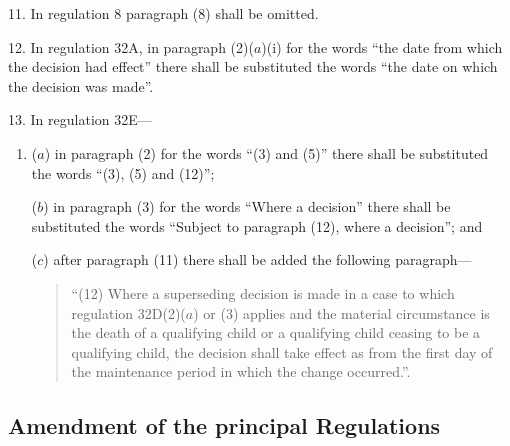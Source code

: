 \documentclass[12pt,a4paper]{article}
\begin{document}
11.  In regulation 8 paragraph (8) shall be omitted.

\medskip

12.  In regulation 32A, in paragraph (2)($a$)(i)  for the words “the date from which the decision had effect” there shall be substituted the words “the date on which the decision was made”.

\medskip

13.  In regulation 32E—
\begin{enumerate}\item[]
($a$) in paragraph (2) for the words “(3) and (5)” there shall be substituted the words “(3), (5) and (12)”;

($b$) in paragraph (3) for the words “Where a decision” there shall be substituted the words “Subject to paragraph (12), where a decision”; and

($c$) after paragraph (11) there shall be added the following paragraph—
\begin{quotation}
“(12) Where a superseding decision is made in a case to which regulation 32D(2)($a$)  or (3) applies and the material circumstance is the death of a qualifying child or a qualifying child ceasing to be a qualifying child, the decision shall take effect as from the first day of the maintenance period in which the change occurred.”.
\end{quotation}
\end{enumerate}

\subsection[14--35. Amendment of the principal Regulations]{Amendment of the principal Regulations}
\end{document}

